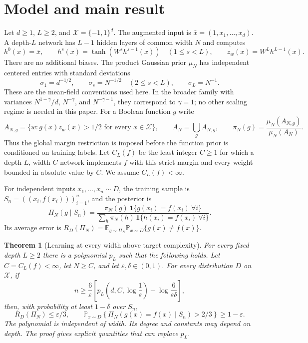 \documentclass[11pt]{article}
\newtheorem{theorem}{Theorem}[section]\newtheorem{proposition}[theorem]{Proposition}
\theoremstyle{remark}\newtheorem{remark}[theorem]{Remark}
\newcommand{\E}{\mathbb E}\newcommand{\Prb}{\mathbb P}\renewcommand{\Pr}{\mathbb P}\newcommand{\R}{\mathbb R}
\begin{document}
\section{Model and main result}\label{sec:model}
Let $d\geq1$, $L\geq2$, and $\mathcal X=\{-1,1\}^d$.
The augmented input is $\bar x=(1,x_1,\ldots,x_d)$. A depth-$L$ network
has $L-1$ hidden layers of common width $N$ and computes
\[
 h^0(x)=\bar x,\qquad h^s(x)=\tanh(W^sh^{s-1}(x))\quad(1\leq s<L),
 \qquad z_w(x)=W^Lh^{L-1}(x).
\]
There are no additional biases. The product Gaussian prior $\mu_N$ has
independent centered entries with standard deviations
\[
 \sigma_1=d^{-1/2},\qquad
 \sigma_s=N^{-1/2}\quad(2\leq s<L),\qquad
 \sigma_L=N^{-1}.
\]
These are the mean-field conventions used here. In the broader family with
variances $N^{1-\gamma}/d$, $N^{-\gamma}$, and $N^{-\gamma-1}$, they
correspond to $\gamma=1$; no other scaling regime is needed in this paper.
For a Boolean function $g$ write
\[
 A_{N,g}=\{w:g(x)z_w(x)>1/2\text{ for every }x\in\mathcal X\},
 \qquad A_N=\bigcup_g A_{N,g},
 \qquad \pi_N(g)=\frac{\mu_N(A_{N,g})}{\mu_N(A_N)}.
\]
Thus the global margin restriction is imposed before the function prior is
conditioned on training labels. Let $C_L(f)$ be the least integer $C\geq1$
for which a depth-$L$, width-$C$ network implements $f$ with this strict
margin and every weight bounded in absolute value by $C$.
We assume $C_L(f)<\infty$.

For independent inputs $x_1,\ldots,x_n\sim D$, the training sample is
$S_n=((x_i,f(x_i)))_{i=1}^n$, and the posterior is
\[
 \Pi_N(g\mid S_n)=
 \frac{\pi_N(g)\,\mathbf1\{g(x_i)=f(x_i)\ \forall i\}}
 {\sum_h\pi_N(h)\,\mathbf1\{h(x_i)=f(x_i)\ \forall i\}}.
\]
Its average error is
$R_D(\Pi_N)=\E_{g\sim\Pi_N}\Prb_{x\sim D}\{g(x)\ne f(x)\}$.

\begin{theorem}[Learning at every width above target complexity]
\label{thm:main}
For every fixed depth $L\geq2$ there is a polynomial $p_L$ such that the
following holds. Let $C=C_L(f)<\infty$, let $N\geq C$, and let
$\varepsilon,\delta\in(0,1)$. For every distribution $D$ on $\mathcal X$,
if
\begin{equation}\label{eq:main-sample}
 n\geq\frac6\varepsilon\left[
 p_L\!\left(d,C,\log\frac1\varepsilon\right)
       +\log\frac6{\varepsilon\delta}\right],
\end{equation}
then, with probability at least $1-\delta$ over $S_n$,
\[
 R_D(\Pi_N)\leq\varepsilon/3,
 \qquad
 \Prb_{x\sim D}\!\left\{
   \Pi_N(g(x)=f(x)\mid S_n)>2/3\right\}\geq1-\varepsilon.
\]
The polynomial is independent of width. Its degree and constants may depend
on depth. The proof gives explicit quantities that can replace $p_L$.
\end{theorem}
\end{document}
